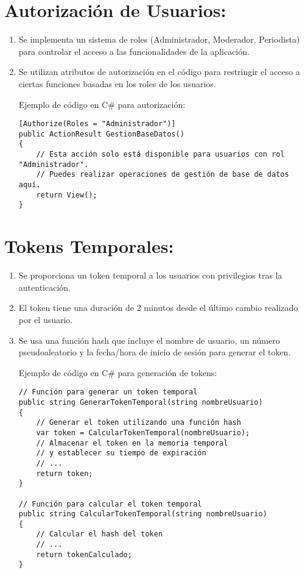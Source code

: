 \documentclass{article}
\begin{document}
\section{Autorización de Usuarios:}

\begin{enumerate}[label=2.\arabic*]
\item Se implementa un sistema de roles (Administrador, Moderador, Periodista) para controlar el acceso a las funcionalidades de la aplicación.
\item Se utilizan atributos de autorización en el código para restringir el acceso a ciertas funciones basadas en los roles de los usuarios.

Ejemplo de código en C# para autorización:

\begin{verbatim}
[Authorize(Roles = "Administrador")]
public ActionResult GestionBaseDatos()
{
    // Esta acción solo está disponible para usuarios con rol "Administrador".
    // Puedes realizar operaciones de gestión de base de datos aquí.
    return View();
}
\end{verbatim}

\end{enumerate}

\section{Tokens Temporales:}

\begin{enumerate}[label=3.\arabic*]
\item Se proporciona un token temporal a los usuarios con privilegios tras la autenticación.
\item El token tiene una duración de 2 minutos desde el último cambio realizado por el usuario.
\item Se usa una función hash que incluye el nombre de usuario, un número pseudoaleatorio y la fecha/hora de inicio de sesión para generar el token.

Ejemplo de código en C# para generación de tokens:

\begin{verbatim}
// Función para generar un token temporal
public string GenerarTokenTemporal(string nombreUsuario)
{
    // Generar el token utilizando una función hash
    var token = CalcularTokenTemporal(nombreUsuario);
    // Almacenar el token en la memoria temporal
    // y establecer su tiempo de expiración
    // ...
    return token;
}

// Función para calcular el token temporal
public string CalcularTokenTemporal(string nombreUsuario)
{
    // Calcular el hash del token
    // ...
    return tokenCalculado;
}
\end{verbatim}

\end{enumerate}
\end{document}
